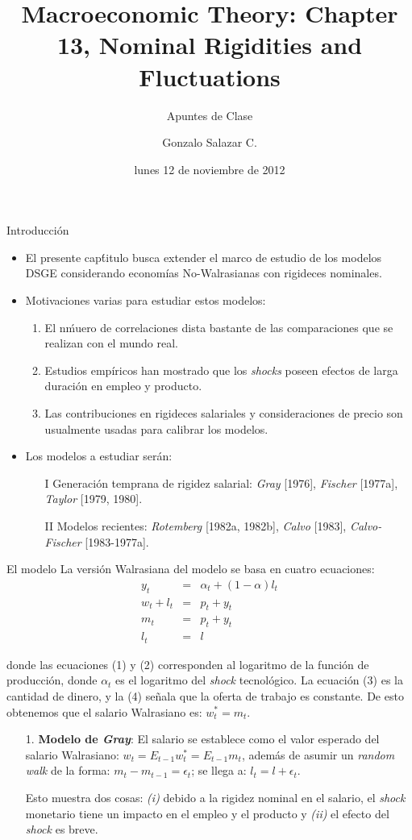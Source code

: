 \documentclass{beamer}
\title{Macroeconomic Theory: Chapter 13, \textbf{Nominal Rigidities and Fluctuations}}
\subtitle{Apuntes de Clase}
\author{Gonzalo Salazar C. }
\date{lunes 12 de noviembre de 2012}
\begin{document}
\frame{\titlepage}


\begin{frame}{Introducci\'on}
\begin{itemize}
\item{El presente cap\'titulo busca extender el marco de estudio de los modelos DSGE considerando econom\'ias No-Walrasianas con rigideces nominales.}
\item{Motivaciones varias para estudiar estos modelos:}
	\begin{enumerate}
	\item{El n\'muero de correlaciones dista bastante de las comparaciones que se realizan con el mundo real.}
	\item{Estudios emp\'iricos han mostrado que los \emph{shocks} poseen efectos de larga duraci\'on en empleo y producto.}
	\item{Las contribuciones en rigideces salariales y consideraciones de precio son usualmente usadas para calibrar los modelos.}		
	\end{enumerate}	
\item{Los modelos a estudiar ser\'an:}
	\begin{itemize}
	\item[I]{Generaci\'on temprana de rigidez salarial: \emph{Gray} [1976], \emph{Fischer} [1977a], \emph{Taylor} [1979, 1980].}
	\item[II]{Modelos recientes: \emph{Rotemberg} [1982a, 1982b], \emph{Calvo} [1983], \emph{Calvo-Fischer} [1983-1977a].}
	\end{itemize}	
\end{itemize}
\end{frame}


\begin{frame}{El modelo}
La versi\'on Walrasiana del modelo se basa en cuatro ecuaciones:
\begin{eqnarray}
y_{t} & = & \alpha_{t}+(1-\alpha)l_{t} \\
w_{t}+l_{t} & = & p_{t} + y_{t} \\
m_{t} & = & p_{t}+y_{t} \\
l_{t} & = & l
\end{eqnarray}

donde las ecuaciones (1) y (2) corresponden al logaritmo de la funci\'on de producci\'on, donde $\alpha_{t}$ es el logaritmo del \emph{shock} tecnol\'ogico. La ecuaci\'on (3) es la cantidad de dinero, y la (4) se\~nala que la oferta de trabajo es constante. De esto obtenemos que el salario Walrasiano es: $w^{*}_{t}=m_{t}$.

\begin{enumerate}
\item[1.]{\textbf{Modelo de \emph{Gray}}: El salario se establece como el valor esperado del salario Walrasiano: $w_{t}=E_{t-1}w^{*}_{t}=E_{t-1}m_{t}$, adem\'as de asumir un \emph{random walk} de la forma: $m_{t}-m_{t-1}=\epsilon_{t}$; se llega a: $l_{t}=l+\epsilon_{t}$.}

Esto muestra dos cosas: \emph{(i)} debido a la rigidez nominal en el salario, el \emph{shock} monetario tiene un impacto en el empleo y el producto y \emph{(ii)} el efecto del \emph{shock} es breve.
\end{enumerate}
\end{frame}
\end{document}
